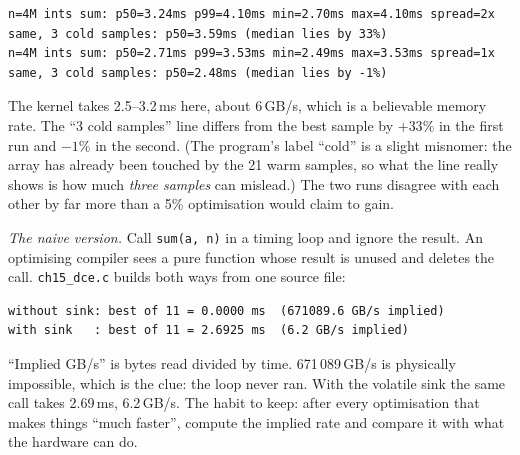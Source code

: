 \begin{example}
\begin{lstlisting}[basicstyle=\ttfamily\scriptsize,caption={Real output of
\texttt{ch15\_bench}, two consecutive runs (Linux container).}]
n=4M ints sum: p50=3.24ms p99=4.10ms min=2.70ms max=4.10ms spread=2x
same, 3 cold samples: p50=3.59ms (median lies by 33%)
n=4M ints sum: p50=2.71ms p99=3.53ms min=2.49ms max=3.53ms spread=1x
same, 3 cold samples: p50=2.48ms (median lies by -1%)
\end{lstlisting}
The kernel takes 2.5--3.2\,ms here, about 6\,GB/s, which is a
believable memory rate. The ``3 cold samples'' line differs from the
best sample by $+33\%$ in the first run and $-1\%$ in the second.
(The program's label ``cold'' is a slight misnomer: the array has
already been touched by the 21 warm samples, so what the line really
shows is how much \emph{three samples} can mislead.) The two runs
disagree with each other by far more than a 5\% optimisation would
claim to gain.
\end{example}

\begin{example}
\emph{The naive version.} Call \texttt{sum(a, n)} in a timing loop
and ignore the result. An optimising compiler sees a pure function
whose result is unused and deletes the call. \texttt{ch15\_dce.c}
builds both ways from one source file:

\begin{lstlisting}[basicstyle=\ttfamily\scriptsize,caption={Real output
(Linux container, \texttt{gcc -O2}); the second build adds
\texttt{-DSINK}, which stores each result into a \texttt{volatile}
variable.}]
without sink: best of 11 = 0.0000 ms  (671089.6 GB/s implied)
with sink   : best of 11 = 2.6925 ms  (6.2 GB/s implied)
\end{lstlisting}
``Implied GB/s'' is bytes read divided by time. 671\,089\,GB/s is
physically impossible, which is the clue: the loop never ran. With the
volatile sink the same call takes 2.69\,ms, 6.2\,GB/s. The habit to
keep: after every optimisation that makes things ``much faster'',
compute the implied rate and compare it with what the hardware can do.
\end{example}

